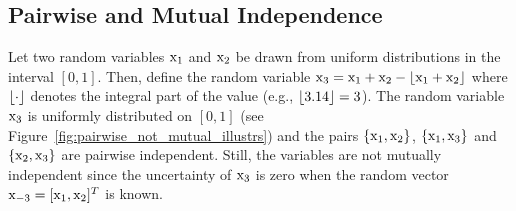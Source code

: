 \subsection{Pairwise and Mutual Independence} \label{subapp:pairwise_vs_mutual_ex}

\begin{example} \label{example:pairwise_vs_mutual}
    Let two random variables ${\textnormal{x}}_1$ and ${\textnormal{x}}_2$ be drawn from uniform distributions in the interval $\left[0,1\right]$. Then, define the random variable ${\textnormal{x}}_3 = {\textnormal{x}}_1 + {\textnormal{x}}_2 - \lfloor {\textnormal{x}}_1 + {\textnormal{x}}_2 \rfloor$ where $\lfloor \cdot \rfloor$ denotes the integral part of the value (e.g., $\lfloor 3.14 \rfloor = 3$).
    \newline The random variable ${\textnormal{x}}_3$ is uniformly distributed on $\left[0, 1\right]$ (see Figure~\ref{fig:pairwise_not_mutual_illustrs}) and the pairs $\{{\textnormal{x}}_1, {\textnormal{x}}_2\}$, $\{{\textnormal{x}}_1, {\textnormal{x}}_3\}$ and $\{{\textnormal{x}}_2, {\textnormal{x}}_3\}$ are pairwise independent. Still, the variables are not mutually independent since the uncertainty of ${\textnormal{x}}_3$ is zero when the random vector ${\textnormal{x}}_{-3} = [{\textnormal{x}}_1, {\textnormal{x}}_2]^T$ is known.
\end{example}
